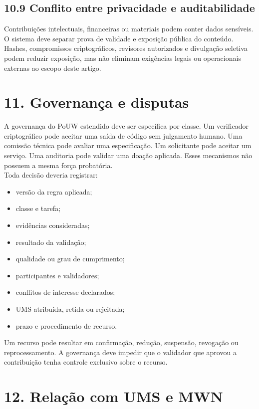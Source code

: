 \documentclass[12pt,a4paper]{article}
\begin{document}
\subsection{10.9 Conflito entre privacidade e auditabilidade}

Contribuições intelectuais, financeiras ou materiais podem conter dados sensíveis. O sistema deve separar prova de validade e exposição pública do conteúdo. Hashes, compromissos criptográficos, revisores autorizados e divulgação seletiva podem reduzir exposição, mas não eliminam exigências legais ou operacionais externas ao escopo deste artigo.\\


\section{11. Governança e disputas}

A governança do PoUW estendido deve ser específica por classe. Um verificador criptográfico pode aceitar uma saída de código sem julgamento humano. Uma comissão técnica pode avaliar uma especificação. Um solicitante pode aceitar um serviço. Uma auditoria pode validar uma doação aplicada. Esses mecanismos não possuem a mesma força probatória.\\

Toda decisão deveria registrar:\\

\begin{itemize}
\item versão da regra aplicada;
\item classe e tarefa;
\item evidências consideradas;
\item resultado da validação;
\item qualidade ou grau de cumprimento;
\item participantes e validadores;
\item conflitos de interesse declarados;
\item UMS atribuída, retida ou rejeitada;
\item prazo e procedimento de recurso.

\end{itemize}
Um recurso pode resultar em confirmação, redução, suspensão, revogação ou reprocessamento. A governança deve impedir que o validador que aprovou a contribuição tenha controle exclusivo sobre o recurso.\\


\section{12. Relação com UMS e MWN}
\end{document}
